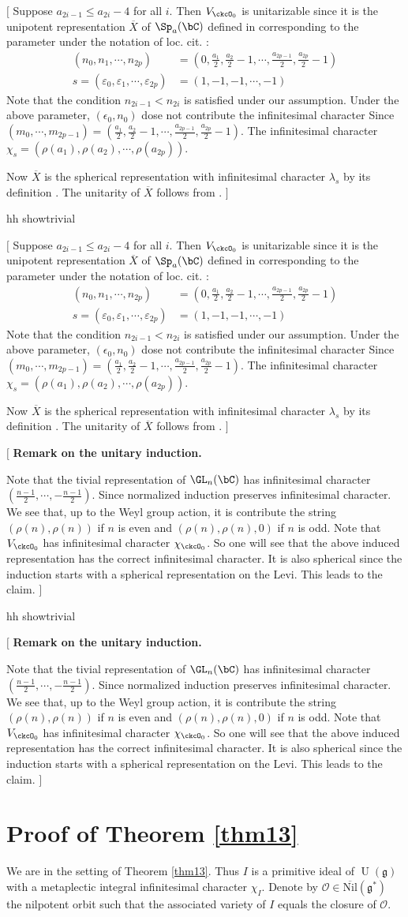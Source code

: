 \documentclass[12pt,a4paper]{amsart}
\newcommand{\trivial}[2][]{\if\relax\detokenize{#1}\relax
{\color{Bittersweet} \vspace{0em} $[$  #2 $]$}
\else
\ifx#1h
\ifcsname showtrivial\endcsname
{\color{orange} \vspace{0em}  $[$ #2 $]$}
\fi
\else {\red Wrong argument!} \fi
\fi
}
\newcommand{\CO}{{\mathcal {O}}}
\newcommand{\oU}{\operatorname{U}}
\newcommand{\g}{\mathfrak g}
\numberwithin{equation}{section}
\theoremstyle{remark}
\begin{document}
  \trivial[h]{ Suppose $a_{2i-1}\leq a_{2i}-4$ for all $i$. Then $V_{\ckcO_0}$ is
    unitarizable since it is the unipotent representation $\overline{X}$ of $\Sp_{a}(\bC)$
    defined in \cite[p~157-158]{B89} corresponding to the parameter under the
    notation of loc. cit. :
  \[
    \begin{split}
      (n_0, n_1, \cdots, n_{2p}) &= (0, \frac{a_1}{2}, \frac{a_2}{2}-1, \cdots,
      \frac{a_{2p-1}}{2}, \frac{a_{2p}}{2}-1)\\
      s= (\varepsilon_0, \varepsilon_1, \cdots, \varepsilon_{2p}) &= (1, -1, -1,
      \cdots, -1)
    \end{split}
  \]
  Note that the condition $n_{2i-1}< n_{2i}$ is satisfied under our assumption.
  Under the above parameter,
    $(\epsilon_0, n_0)$ dose not contribute the infinitesimal character
  Since
  $(m_0, \cdots, m_{2p-1}) = (\frac{a_1}{2}, \frac{a_2}{2}-1, \cdots,
  \frac{a_{2p-1}}{2}, \frac{a_{2p}}{2}-1)$.
  The infinitesimal character $\chi_s = (\rho(a_1), \rho(a_2), \cdots, \rho(a_{2p}))$.

  Now $\overline{X}$ is the spherical representation with
  infinitesimal
  character $\lambda_s$ by its definition \cite[(10.2.1)]{B89}. The unitarity
  of $\overline{X}$ follows from \cite[Section~10, see also line~6, p158]{B89}.
}


\trivial[h]{
    {\bf Remark on the unitary induction.}

  Note that the tivial representation of
    $\GL_n(\bC)$ has infinitesimal character $(\frac{n-1}{2}, \cdots,
    -\frac{n-1}{2})$. Since normalized induction preserves infinitesimal
    character. We see that, up to the Weyl group action, it is contribute the
    string $(\rho(n),\rho(n))$ if $n$ is even and $(\rho(n), \rho(n), 0)$ if
    $n$ is odd. Note that
    $V_{\ckcO_0}$ has infinitesimal character
    $\chi_{\ckcO_0}$.  So one will see that the above induced representation has
    the correct infinitesimal character. It is also spherical since the
    induction starts with a spherical representation on the Levi.  This leads
    to the claim.  }


\section{Proof of Theorem \ref{thm13}}

We are in the setting of Theorem \ref{thm13}. Thus $I$ is a primitive ideal of $\oU(\g)$ with a metaplectic integral infinitesimal character $\chi_{I}$. Denote by $\CO\in \overline{\mathrm{Nil}}(\g^*)$ the nilpotent orbit such that the associated variety of $I$ equals the closure of $\CO$.
\end{document}
